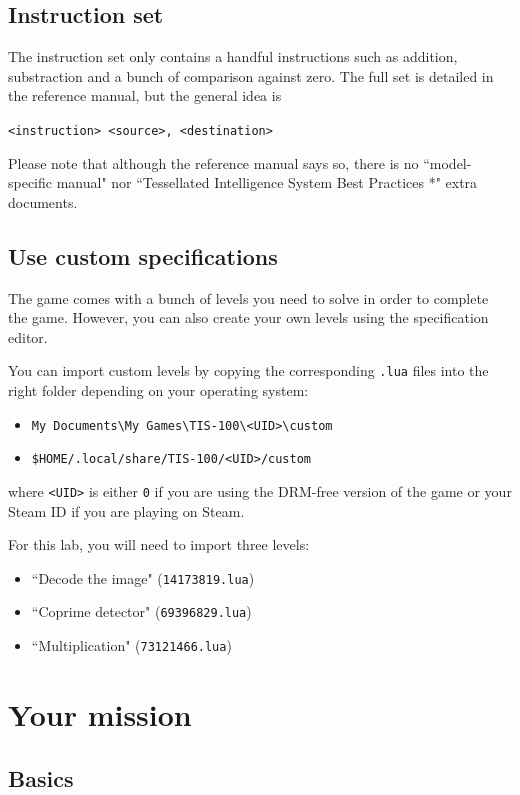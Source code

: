 \documentclass[10pt,a4paper]{article}
\theoremstyle{definition}%
\begin{document}
\subsection{Instruction set}
The instruction set only contains a handful instructions such as addition, substraction and a bunch of comparison against zero.
The full set is detailed in the reference manual, but the general idea is
\begin{center}
	\verb!<instruction> <source>, <destination>!
\end{center}

Please note that although the reference manual says so, there is no ``model-specific manual" nor ``Tessellated Intelligence System Best Practices *" extra documents.

\subsection{Use custom specifications}
The game comes with a bunch of levels you need to solve in order to complete the game.
However, you can also create your own levels using the specification editor.

You can import custom levels by copying the corresponding \texttt{.lua} files into the right folder depending on your operating system:
\begin{itemize}
	\item[\faWindows] \verb|My Documents\My Games\TIS-100\<UID>\custom|
	\item[\faLinux] \verb|$HOME/.local/share/TIS-100/<UID>/custom|
\end{itemize}
where \texttt{<UID>} is either \texttt{0} if you are using the DRM-free version of the game or your Steam ID if you are playing on Steam.

For this lab, you will need to import three levels:
\begin{itemize}
	\item ``Decode the image" (\texttt{14173819.lua})
	\item ``Coprime detector" (\texttt{69396829.lua})
	\item ``Multiplication" (\texttt{73121466.lua})
\end{itemize}


\section{Your mission}

\subsection{Basics}
\end{document}
